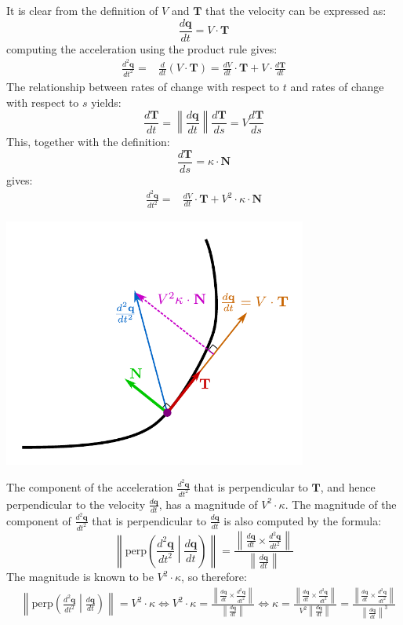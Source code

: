 \documentclass{article}
\begin{document}
It is clear from the definition of \(V\) and \(\mathbf{T}\) that the velocity can be expressed as:
\[\frac{d\mathbf{q}}{dt} = V \cdot \mathbf{T}\]
computing the acceleration using the product rule gives:
\begin{align*}
\frac{d^2 \mathbf{q}}{dt^2} = & \frac{d}{dt}(V \cdot \mathbf{T}) 
= \frac{dV}{dt} \cdot \mathbf{T} + V \cdot \frac{d\mathbf{T}}{dt}
\end{align*}
The relationship between rates of change with respect to \(t\) and rates of change with respect to \(s\) yields: 
\[\frac{d\mathbf{T}}{dt} = \left\|\frac{d\mathbf{q}}{dt}\right\| \frac{d\mathbf{T}}{ds} = V \frac{d\mathbf{T}}{ds}\]
This, together with the definition:
\[\frac{d\mathbf{T}}{ds} = \kappa \cdot \mathbf{N}\]
gives: 
\begin{align*}
\frac{d^2 \mathbf{q}}{dt^2} = & \frac{dV}{dt} \cdot \mathbf{T} + V^2 \cdot \kappa \cdot \mathbf{N}
\end{align*}
\begin{center}
\includegraphics[width = 0.75\textwidth]{acceleration_perpendicular_component}
\end{center}
The component of the acceleration \(\frac{d^2 \mathbf{q}}{dt^2}\) that is perpendicular to \(\mathbf{T}\), and hence perpendicular to the velocity \(\frac{d\mathbf{q}}{dt}\), has a magnitude of \(V^2 \cdot \kappa\). The magnitude of the component of \(\frac{d^2 \mathbf{q}}{dt^2}\) that is perpendicular to \(\frac{d\mathbf{q}}{dt}\) is also computed by the formula:
\[\left\|\text{perp}\left(\frac{d^2 \mathbf{q}}{dt^2}\middle|\frac{d\mathbf{q}}{dt}\right)\right\| = \frac{\left\|\frac{d\mathbf{q}}{dt} \times \frac{d^2 \mathbf{q}}{dt^2}\right\|}{\left\|\frac{d\mathbf{q}}{dt}\right\|}\]
The magnitude is known to be \(V^2 \cdot \kappa\), so therefore:
\begin{align*}
& \left\|\text{perp}\left(\frac{d^2 \mathbf{q}}{dt^2}\middle|\frac{d\mathbf{q}}{dt}\right)\right\| = V^2 \cdot \kappa 
\iff V^2 \cdot \kappa = \frac{\left\|\frac{d\mathbf{q}}{dt} \times \frac{d^2 \mathbf{q}}{dt^2}\right\|}{\left\|\frac{d\mathbf{q}}{dt}\right\|} 
\iff \kappa = \frac{\left\|\frac{d\mathbf{q}}{dt} \times \frac{d^2 \mathbf{q}}{dt^2}\right\|}{V^2 \left\|\frac{d\mathbf{q}}{dt}\right\|} = \frac{\left\|\frac{d\mathbf{q}}{dt} \times \frac{d^2 \mathbf{q}}{dt^2}\right\|}{\left\|\frac{d\mathbf{q}}{dt}\right\|^3}
\end{align*}
\end{document}
